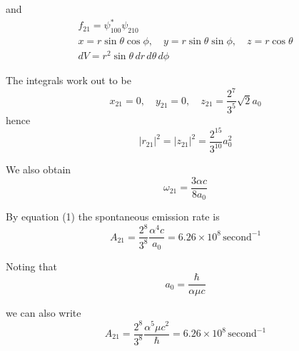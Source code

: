 and
\begin{gather*}
f_{21}=\psi_{100}^*\psi_{210}%
\\[1ex]
x=r\sin\theta\cos\phi,
\quad
y=r\sin\theta\sin\phi,
\quad
z=r\cos\theta
\\[1ex]
dV=r^2\sin\theta\,dr\,d\theta\,d\phi
\end{gather*}

The integrals work out to be
\begin{equation*}
x_{21}=0,
\quad
y_{21}=0,
\quad
z_{21}=\frac{2^7}{3^5}\sqrt2a_0
\end{equation*}
hence
\begin{equation*}
|r_{21}|^2=|z_{21}|^2=\frac{2^{15}}{3^{10}}a_0^2
\end{equation*}

We also obtain
\begin{equation*}
\omega_{21}=\frac{3\alpha c}{8a_0}
\end{equation*}

By equation (1) the spontaneous emission rate is
\begin{equation*}
A_{21}=\frac{2^8}{3^8}\frac{\alpha^4c}{a_0}=6.26\times10^8\,\text{second}^{-1}
\end{equation*}

Noting that
\begin{equation*}
a_0=\frac{\hbar}{\alpha\mu c}
\end{equation*}

we can also write
\begin{equation*}
A_{21}=\frac{2^8}{3^8}\frac{\alpha^5\mu c^2}{\hbar}=6.26\times10^8\,\text{second}^{-1}
\end{equation*}


